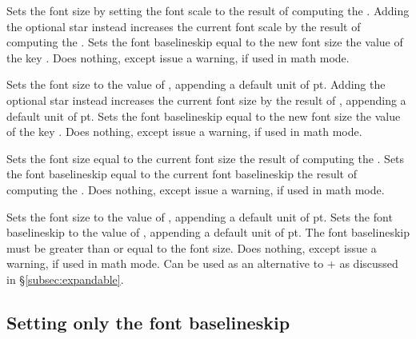 \documentclass{beery}
\begin{document}
 \sarg{} 
\KeepNextPar*

Sets the font size by setting the font scale to the result of computing the .
Adding the optional star instead increases the current font scale by the result of computing the .
Sets the font baselineskip equal to the new font size \texttimes{} the value of the key .
Does nothing, except issue a warning, if used in math mode.

 \sarg{} 
\KeepNextPar*

Sets the font size to the value of , appending a default unit of \unit{pt}.
Adding the optional star instead increases the current font size by the result of , appending a default unit of \unit{pt}.
Sets the font baselineskip equal to the new font size \texttimes{} the value of the key .
Does nothing, except issue a warning, if used in math mode.

 
\KeepNextPar*

Sets the font size equal to the current font size \texttimes{} the result of computing the .
Sets the font baselineskip equal to the current font baselineskip \texttimes{} the result of computing the .
Does nothing, except issue a warning, if used in math mode.

  
\KeepNextPar*

Sets the font size to the value of , appending a default unit of \unit{pt}.
Sets the font baselineskip to the value of , appending a default unit of \unit{pt}.
The font baselineskip must be greater than or equal to the font size.
Does nothing, except issue a warning, if used in math mode.
Can be used as an alternative to  +  as discussed in \S\ref{subsec:expandable}.

\subsection{Setting only the font baselineskip}
\label{subsec:setfontbaselineskip}

 \sarg{} 
\KeepNextPar*
\end{document}
